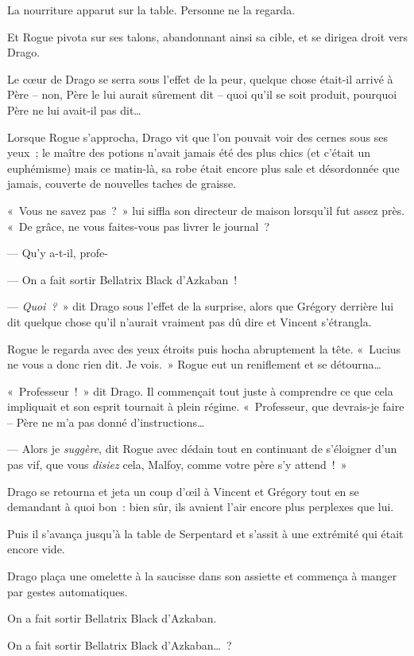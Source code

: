 La nourriture apparut sur la table.
Personne ne la regarda.

Et Rogue pivota sur ses talons, abandonnant ainsi sa cible, et se dirigea droit vers Drago.

Le cœur de Drago se serra sous l'effet de la peur, quelque chose était-il arrivé à Père -- non, Père le lui aurait sûrement dit -- quoi qu'il se soit produit, pourquoi Père ne lui avait-il pas dit…

Lorsque Rogue s'approcha, Drago vit que l'on pouvait voir des cernes sous ses yeux~; le maître des potions n'avait jamais été des plus chics (et c'était un euphémisme) mais ce matin-là, sa robe était encore plus sale et désordonnée que jamais, couverte de nouvelles taches de graisse.

«~Vous ne savez pas~?~»
lui siffla son directeur de maison lorsqu'il fut assez près.
«~De grâce, ne vous faites-vous pas livrer le journal~?

--- Qu'y a-t-il, profe-

--- On a fait sortir Bellatrix Black d'Azkaban~!

--- \emph{Quoi~?}~» dit Drago sous l'effet de la surprise, alors que Grégory derrière lui dit quelque chose qu'il n'aurait vraiment pas dû dire et Vincent s'étrangla.

Rogue le regarda avec des yeux étroits puis hocha abruptement la tête.
«~Lucius ne vous a donc rien dit.
Je vois.~»
Rogue eut un reniflement et se détourna…

«~Professeur~!~»
dit Drago.
Il commençait tout juste à comprendre ce que cela impliquait et son esprit tournait à plein régime.
«~Professeur, que devrais-je faire -- Père ne m'a pas donné d'instructions…

--- Alors je \emph{suggère}, dit Rogue avec dédain tout en continuant de s'éloigner d'un pas vif, que vous \emph{disiez} cela, Malfoy, comme votre père s'y attend~!~»

Drago se retourna et jeta un coup d'œil à Vincent et Grégory tout en se demandant à quoi bon~: bien sûr, ils avaient l'air encore plus perplexes que lui.

Puis il s'avança jusqu'à la table de Serpentard et s'assit à une extrémité qui était encore vide.

Drago plaça une omelette à la saucisse dans son assiette et commença à manger par gestes automatiques.

On a fait sortir Bellatrix Black d'Azkaban.

On a fait sortir Bellatrix Black d'Azkaban…~?

